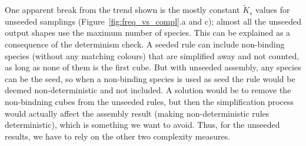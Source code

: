 One apparent break from the trend shown is the mostly constant \(\widetilde{K}_s\) values for unseeded samplings (Figure~\ref{fig:freq_vs_compl}.a and c); almost all the unseeded output shapes use the maximum number of species. This can be explained as a consequence of the determinism check. A seeded rule can include non-binding species (without any matching colours) that are simplified away and not counted, as long as none of them is the first cube. But with unseeded assembly, any species can be the seed, so when a non-binding species is used as seed the rule would be deemed non-deterministic and not included. A solution would be to remove the non-bindning cubes from the unseeded rules, but then the simplification process would actually affect the assembly result (making non-deterministic rules deterministic), which is something we want to avoid. Thus, for the unseeded results, we have to rely on the other two complexity measures.







